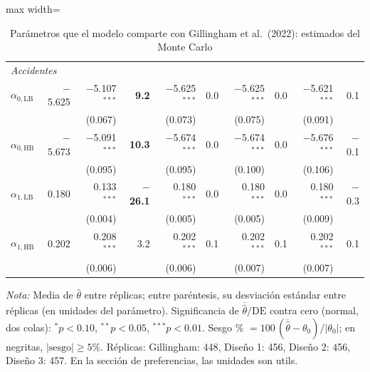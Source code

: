 \begin{table}[htbp]
\begin{adjustbox}{max width=\textwidth}
\begin{tabular}{l r rr rr rr rr}
\multicolumn{10}{l}{\textit{Accidentes}}\\
$\alpha_{0,\text{LB}}$ & $-$5.625 & $-$5.107$^{***}$ & \textbf{9.2} & $-$5.625$^{***}$ & 0.0 & $-$5.625$^{***}$ & 0.0 & $-$5.621$^{***}$ & 0.1\\
 &  & (0.067) &  & (0.073) &  & (0.075) &  & (0.091) & \\[1pt]
$\alpha_{0,\text{HB}}$ & $-$5.673 & $-$5.091$^{***}$ & \textbf{10.3} & $-$5.674$^{***}$ & 0.0 & $-$5.674$^{***}$ & 0.0 & $-$5.676$^{***}$ & $-$0.1\\
 &  & (0.095) &  & (0.095) &  & (0.100) &  & (0.106) & \\[1pt]
$\alpha_{1,\text{LB}}$ & 0.180 & 0.133$^{***}$ & \textbf{$-$26.1} & 0.180$^{***}$ & 0.0 & 0.180$^{***}$ & 0.0 & 0.180$^{***}$ & $-$0.3\\
 &  & (0.004) &  & (0.005) &  & (0.005) &  & (0.009) & \\[1pt]
$\alpha_{1,\text{HB}}$ & 0.202 & 0.208$^{***}$ & 3.2 & 0.202$^{***}$ & 0.1 & 0.202$^{***}$ & 0.1 & 0.202$^{***}$ & 0.1\\
 &  & (0.006) &  & (0.006) &  & (0.007) &  & (0.007) & \\[1pt]
\bottomrule
\end{tabular}
\end{adjustbox}
\caption{Parámetros que el modelo comparte con Gillingham et al.\ (2022): estimados del Monte Carlo}
\label{tab:mc-comunes}
\par\smallskip
\begin{minipage}{\textwidth}\footnotesize
\textit{Nota:} Media de $\hat\theta$ entre réplicas;
entre paréntesis, su desviación estándar entre réplicas (en unidades del parámetro).
Significancia de $\overline{\hat\theta}/\text{DE}$ contra cero (normal, dos colas):
$^{*}p<0.10$, $^{**}p<0.05$, $^{***}p<0.01$.
Sesgo \% $=100\,(\overline{\hat\theta}-\theta_0)/|\theta_0|$; en negritas, $|\text{sesgo}|\ge5\%$.
Réplicas: Gillingham: 448, Diseño 1: 456, Diseño 2: 456, Diseño 3: 457. En la sección de preferencias, las unidades son utils.
\end{minipage}
\end{table}
